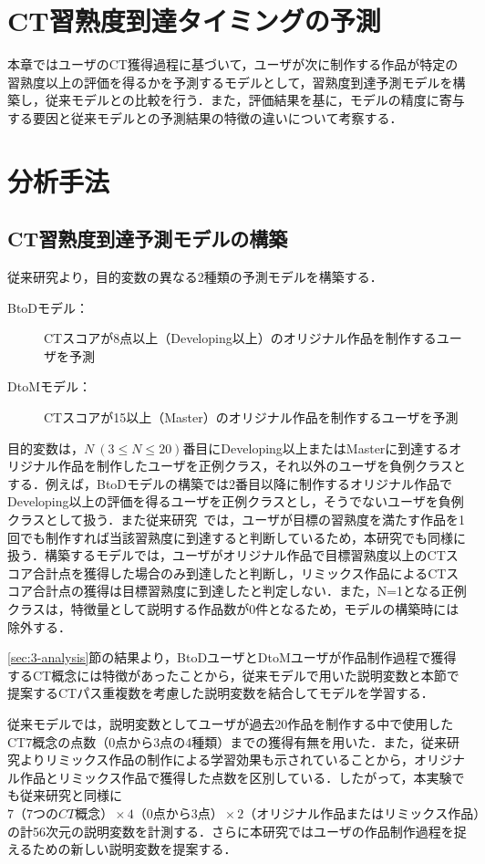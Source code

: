 \documentclass[11pt,dvipdfmx]{jreport}
\begin{document}
\section{CT習熟度到達タイミングの予測}
本章ではユーザのCT獲得過程に基づいて，ユーザが次に制作する作品が特定の習熟度以上の評価を得るかを予測するモデルとして，習熟度到達予測モデルを構築し，従来モデルとの比較を行う．また，評価結果を基に，モデルの精度に寄与する要因と従来モデルとの予測結果の特徴の違いについて考察する．
\section{分析手法}
\subsection{CT習熟度到達予測モデルの構築}
従来研究より，目的変数の異なる2種類の予測モデルを構築する．

\begin{description}
\item [BtoDモデル：]CTスコアが8点以上（Developing以上）のオリジナル作品を制作するユーザを予測
\item [DtoMモデル：]CTスコアが15以上（Master）のオリジナル作品を制作するユーザを予測
\end{description}

目的変数は，{$N~(3 \leq N \leq 20)$}番目にDeveloping以上またはMasterに到達するオリジナル作品を制作したユーザを正例クラス，それ以外のユーザを負例クラスとする．例えば，BtoDモデルの構築では2番目以降に制作するオリジナル作品でDeveloping以上の評価を得るユーザを正例クラスとし，そうでないユーザを負例クラスとして扱う．また従来研究~\cite{Ando_2021}では，ユーザが目標の習熟度を満たす作品を1回でも制作すれば当該習熟度に到達すると判断しているため，本研究でも同様に扱う．構築するモデルでは，ユーザがオリジナル作品で目標習熟度以上のCTスコア合計点を獲得した場合のみ到達したと判断し，リミックス作品によるCTスコア合計点の獲得は目標習熟度に到達したと判定しない．また，N=1となる正例クラスは，特徴量として説明する作品数が0件となるため，モデルの構築時には除外する．

\ref{sec:3-analysis}節の結果より，BtoDユーザとDtoMユーザが作品制作過程で獲得するCT概念には特徴があったことから，従来モデルで用いた説明変数と本節で提案するCTパス重複数を考慮した説明変数を結合してモデルを学習する．

従来モデルでは，説明変数としてユーザが過去20作品を制作する中で使用したCT7概念の点数（0点から3点の4種類）までの獲得有無を用いた．また，従来研究\cite{Dasgupta_2016}よりリミックス作品の制作による学習効果も示されていることから，オリジナル作品とリミックス作品で獲得した点数を区別している．したがって，本実験でも従来研究と同様に$7（7つのCT概念） \times 4（0点から3点） \times 2（オリジナル作品またはリミックス作品）$の計56次元の説明変数を計測する．さらに本研究ではユーザの作品制作過程を捉えるための新しい説明変数を提案する．
\end{document}
